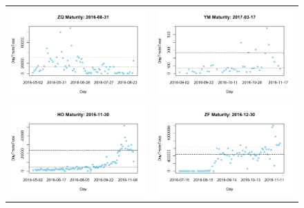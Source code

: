 \documentclass[12pt]{article}
\begin{document}
\begin{figure}[H]
	\begin{center}
		\begin{tabular}{ll}
			\includegraphics[width=8cm]{ZQtradevolumeTrim.png} &
			\includegraphics[width=8cm]{YMtradevolumeTrim.png}\\ 
			\includegraphics[width=8cm]{HOtradevolumeTrim.png} &
			\includegraphics[width=8cm]{ZFtradevolumeTrim.png}\\

\end{tabular}
\end{center}
\end{figure}
\end{document}
